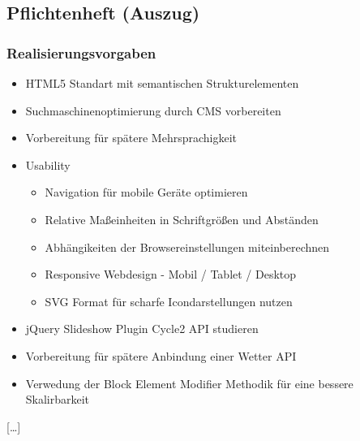 \subsection{Pflichtenheft (Auszug)}
\label{app:Pflichtenheft}

\subsubsection*{Realisierungsvorgaben}

\begin{itemize}

\item HTML5 Standart mit semantischen Strukturelementen 
\item Suchmaschinenoptimierung durch CMS vorbereiten
\item Vorbereitung für spätere Mehrsprachigkeit
\item Usability 
  \begin{itemize}
    \item Navigation für mobile Geräte optimieren
  \item Relative Maßeinheiten in Schriftgrößen und Abständen
  \item Abhängikeiten der Browsereinstellungen miteinberechnen
  \item Responsive Webdesign - Mobil / Tablet / Desktop
  \item SVG Format für scharfe Icondarstellungen nutzen
  \end{itemize}
\item jQuery Slideshow Plugin Cycle2 API studieren
\item Vorbereitung für spätere Anbindung einer Wetter API
\item Verwedung der Block Element Modifier Methodik für eine bessere
Skalirbarkeit
\end{itemize}
[\ldots]   
\clearpage